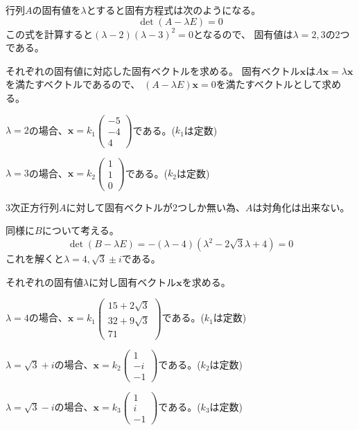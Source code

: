 \documentclass[12pt,b5paper]{ltjsarticle}
\begin{document}
\begin{enumerate}
      \dotfill

      行列$A$の固有値を$\lambda$とすると固有方程式は次のようになる。
      \begin{equation}
       \det(A-\lambda E) =0
      \end{equation}
      この式を計算すると$(\lambda -2)(\lambda -3)^2=0$となるので、
      固有値は$\lambda = 2,3$の2つである。

      それぞれの固有値に対応した固有ベクトルを求める。
      固有ベクトル$\bm{x}$は$A\bm{x}=\lambda\bm{x}$を満たすベクトルであるので、
      $(A-\lambda E)\bm{x}=0$を満たすベクトルとして求める。

      $\lambda = 2$の場合、$\bm{x}= k_1 \begin{pmatrix} -5 \\ -4 \\ 4 \end{pmatrix}$である。($k_1$は定数)

      $\lambda = 3$の場合、$\bm{x}= k_2 \begin{pmatrix} 1 \\ 1 \\ 0 \end{pmatrix}$である。($k_2$は定数)

      3次正方行列$A$に対して固有ベクトルが2つしか無い為、$A$は対角化は出来ない。

      同様に$B$について考える。
      \begin{equation}
       \det(B-\lambda E) = -(\lambda -4)(\lambda^2 -2\sqrt{3}\lambda +4) =0
      \end{equation}
      これを解くと$\lambda = 4, \sqrt{3}\pm i$である。

      それぞれの固有値$\lambda$に対し固有ベクトル$\bm{x}$を求める。

      $\lambda = 4$の場合、$\bm{x}= k_1 \begin{pmatrix} 15+2\sqrt{3} \\ 32+9\sqrt{3} \\ 71 \end{pmatrix}$である。($k_1$は定数)

      $\lambda = \sqrt{3}+i$の場合、$\bm{x}= k_2 \begin{pmatrix} 1 \\ -i \\ -1 \end{pmatrix}$である。($k_2$は定数)

      $\lambda = \sqrt{3}-i$の場合、$\bm{x}= k_3 \begin{pmatrix} 1 \\ i \\ -1 \end{pmatrix}$である。($k_3$は定数)


\end{enumerate}
\end{document}
